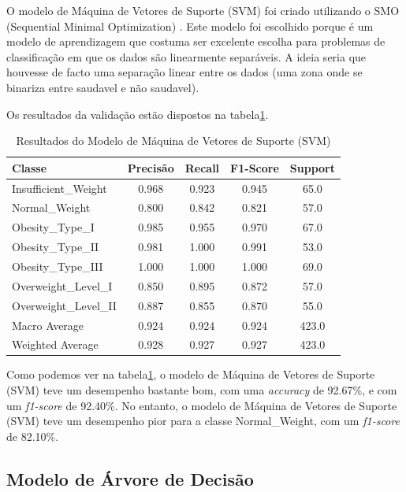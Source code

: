 \documentclass{easychair}
\begin{document}
O modelo de Máquina de Vetores de Suporte (SVM) foi criado utilizando o SMO (Sequential Minimal Optimization) \cite{smo}. Este modelo foi escolhido porque é um modelo de aprendizagem que costuma ser excelente escolha para problemas de classificação em que os dados são linearmente separáveis. A ideia seria que houvesse de facto uma separação linear entre os dados (uma zona onde se binariza entre saudavel e não saudavel).

Os resultados da validação estão dispostos na tabela\ref{tab:svm-results}.

\begin{table}[ht]
  \centering
  \begin{tabular}{l c c c c}
  \toprule
  Classe                & Precisão  & Recall & F1-Score & Support \\
  \midrule
  Insufficient\_Weight  & 0.968     & 0.923  & 0.945    & 65.0    \\
  Normal\_Weight        & 0.800     & 0.842  & 0.821    & 57.0    \\
  Obesity\_Type\_I      & 0.985     & 0.955  & 0.970    & 67.0    \\
  Obesity\_Type\_II     & 0.981     & 1.000  & 0.991    & 53.0    \\
  Obesity\_Type\_III    & 1.000     & 1.000  & 1.000    & 69.0    \\
  Overweight\_Level\_I  & 0.850     & 0.895  & 0.872    & 57.0    \\
  Overweight\_Level\_II & 0.887     & 0.855  & 0.870    & 55.0    \\
  \midrule
  Macro Average         & 0.924     & 0.924  & 0.924    & 423.0   \\
  Weighted Average      & 0.928     & 0.927  & 0.927    & 423.0   \\
  \bottomrule
  \end{tabular}
  \caption{Resultados do Modelo de Máquina de Vetores de Suporte (SVM)}
  \label{tab:svm-results}
\end{table}

Como podemos ver na tabela\ref{tab:svm-results}, o modelo de Máquina de Vetores de Suporte (SVM) teve um desempenho bastante bom, com uma \textit{accuracy} de 92.67\%, e com um \textit{f1-score} de 92.40\%. No entanto, o modelo de Máquina de Vetores de Suporte (SVM) teve um desempenho pior para a classe Normal\_Weight, com um \textit{f1-score} de 82.10\%.

\subsection{Modelo de Árvore de Decisão}
\end{document}
